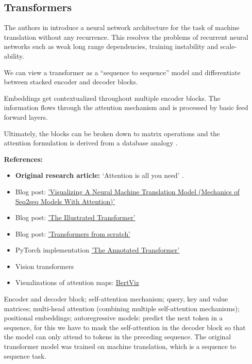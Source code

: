 \documentclass[11pt, a4paper]{amsart}
\begin{document}
\subsection{Transformers}

The authors in \cite{DBLP:journals/corr/VaswaniSPUJGKP17} introduce a neural network architecture for the task of machine translation without any recurrence. 
This resolves the problems of recurrent neural networks such as weak long range dependencies, training instability and scale-ability.

We can view a transformer as a ``sequence to sequence'' model and differentiate between stacked encoder and decoder blocks.

Embeddings get contextualized throughout multiple encoder blocks.
The information flows through the attention mechanism and is processed by basic feed forward layers. 

Ultimately, the blocks can be broken down to matrix operations and the attention formulation is derived from a database analogy \cite{pmlr-v139-schlag21a}.

\noindent \textbf{References:}
\begin{itemize}
	\item \textbf{Original research article:} `Attention is all you need' \cite{DBLP:journals/corr/VaswaniSPUJGKP17}.
	\item Blog post:
	\href{https://jalammar.github.io/visualizing-neural-machine-translation-mechanics-of-seq2seq-models-with-attention/}{'Visualizing A Neural Machine Translation Model (Mechanics of Seq2seq Models With Attention)'}
	\item Blog post:
	\href{https://jalammar.github.io/illustrated-transformer/}{'The Illustrated Transformer'}
	\item Blog post:
	\href{http://peterbloem.nl/blog/transformers}{'Transformers from scratch'}
	\item PyTorch implementation \href{https://nlp.seas.harvard.edu/2018/04/03/attention.html}{'The Annotated Transformer'}
	\item Vision transformers \cite{dosovitskiy2021an}
	\item Visualizations of attention maps:
	\href{https://github.com/jessevig/bertviz}{BertViz}
\end{itemize}

{
	\color{blue}
	
	Encoder and decoder block; self-attention mechanism; query, key and value matrices; multi-head attention (combining multiple self-attention mechanisms); positional embeddings; autoregressive models: predict the next token in a sequence, for this we have to mask the self-attention in the decoder block so that the model can only attend to tokens in the preceding sequence.
	The original transformer model was trained on machine translation, which is a sequence to sequence task.
} %
\end{document}
